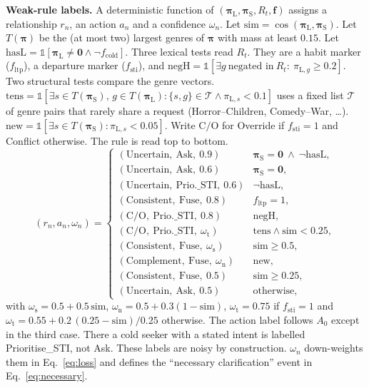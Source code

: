 \textbf{Weak-rule labels.} A deterministic function of $(\boldsymbol{\pi}_{\mathrm{L}},\boldsymbol{\pi}_{\mathrm{S}},R_t,\mathbf{f})$ assigns a relationship $r_n$, an action $a_n$ and a confidence $\omega_n$. Let $\mathrm{sim}=\cos(\boldsymbol{\pi}_{\mathrm{L}},\boldsymbol{\pi}_{\mathrm{S}})$. Let $T(\boldsymbol{\pi})$ be the (at most two) largest genres of $\boldsymbol{\pi}$ with mass at least $0.15$. Let $\mathrm{hasL}=\mathbb{1}[\boldsymbol{\pi}_{\mathrm{L}}\neq\mathbf{0}\wedge\neg f_{\mathrm{cold}}]$. Three lexical tests read $R_t$. They are a habit marker ($f_{\mathrm{ltp}}$), a departure marker ($f_{\mathrm{sti}}$), and $\mathrm{negH}=\mathbb{1}[\exists g\ \text{negated in}\ R_t:\ \pi_{\mathrm{L},g}\ge0.2]$. Two structural tests compare the genre vectors. $\mathrm{tens}=\mathbb{1}[\exists s\in T(\boldsymbol{\pi}_{\mathrm{S}}),\,g\in T(\boldsymbol{\pi}_{\mathrm{L}}):\{s,g\}\in\mathcal{T}\wedge\pi_{\mathrm{L},s}<0.1]$ uses a fixed list $\mathcal{T}$ of genre pairs that rarely share a request (Horror--Children, Comedy--War, \ldots). $\mathrm{new}=\mathbb{1}[\exists s\in T(\boldsymbol{\pi}_{\mathrm{S}}):\pi_{\mathrm{L},s}<0.05]$. Write $\mathrm{C/O}$ for Override if $f_{\mathrm{sti}}=1$ and Conflict otherwise. The rule is read top to bottom.
{\small\begin{equation}
  \label{eq:weakrule}
  (r_n,a_n,\omega_n)=
  \begin{cases}
    (\text{Uncertain},\ \text{Ask},\ 0.9) & \boldsymbol{\pi}_{\mathrm{S}}=\mathbf{0}\ \wedge\ \neg\mathrm{hasL},\\
    (\text{Uncertain},\ \text{Ask},\ 0.6) & \boldsymbol{\pi}_{\mathrm{S}}=\mathbf{0},\\
    (\text{Uncertain},\ \text{Prio.\_STI},\ 0.6) & \neg\mathrm{hasL},\\
    (\text{Consistent},\ \text{Fuse},\ 0.8) & f_{\mathrm{ltp}}=1,\\
    (\mathrm{C/O},\ \text{Prio.\_STI},\ 0.8) & \mathrm{negH},\\
    (\mathrm{C/O},\ \text{Prio.\_STI},\ \omega_{\mathrm{t}}) & \mathrm{tens}\wedge\mathrm{sim}<0.25,\\
    (\text{Consistent},\ \text{Fuse},\ \omega_{\mathrm{s}}) & \mathrm{sim}\ge0.5,\\
    (\text{Complement},\ \text{Fuse},\ \omega_{\mathrm{n}}) & \mathrm{new},\\
    (\text{Consistent},\ \text{Fuse},\ 0.5) & \mathrm{sim}\ge0.25,\\
    (\text{Uncertain},\ \text{Ask},\ 0.5) & \text{otherwise},
  \end{cases}
\end{equation}}
with $\omega_{\mathrm{s}}=0.5+0.5\,\mathrm{sim}$, $\omega_{\mathrm{n}}=0.5+0.3(1-\mathrm{sim})$, $\omega_{\mathrm{t}}=0.75$ if $f_{\mathrm{sti}}=1$ and $\omega_{\mathrm{t}}=0.55+0.2\,(0.25-\mathrm{sim})/0.25$ otherwise. The action label follows $A_0$ except in the third case. There a cold seeker with a stated intent is labelled Prioritise\_STI, not Ask. These labels are noisy by construction. $\omega_n$ down-weights them in Eq.~\eqref{eq:loss} and defines the ``necessary clarification'' event in Eq.~\eqref{eq:necessary}.

